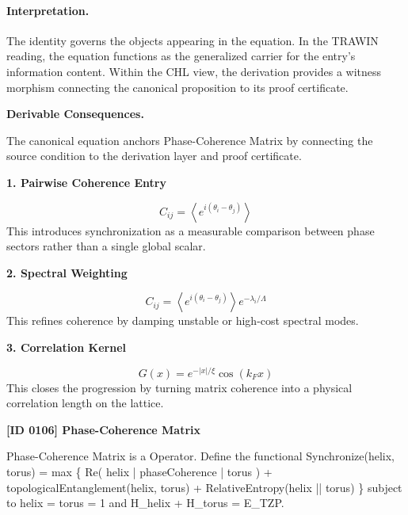 \paragraph{Interpretation.}
The identity governs the objects appearing in the equation. In the TRAWIN reading, the equation functions as the generalized carrier for the entry’s information content. Within the CHL view, the derivation provides a witness morphism connecting the canonical proposition to its proof certificate.

\par\vspace{0.35em}
\noindent\textbf{Derivable Consequences.}\quad
\begingroup
\footnotesize
\raggedright
The canonical equation anchors Phase-Coherence Matrix by connecting the source condition to the derivation layer and proof certificate.
\par\endgroup

\noindent\textbf{1. Pairwise Coherence Entry}\par
\[
C_{ij} = \left\langle e^{i(\theta_i-\theta_j)} \right\rangle
\]
\noindent This introduces synchronization as a measurable comparison between phase sectors rather than a single global scalar.\par
\noindent\textbf{2. Spectral Weighting}\par
\[
C_{ij} = \left\langle e^{i(\theta_i-\theta_j)} \right\rangle e^{-\lambda_i/\Lambda}
\]
\noindent This refines coherence by damping unstable or high-cost spectral modes.\par
\noindent\textbf{3. Correlation Kernel}\par
\[
G(x)= e^{-\lvert x\rvert/\xi}\cos(k_F x)
\]
\noindent This closes the progression by turning matrix coherence into a physical correlation length on the lattice.\par

\clearpage
\noindent\textbf{[ID 0106] Phase-Coherence Matrix}\par
\vspace{0.35em}
\begingroup\small
{}
Phase-Coherence Matrix is a Operator. Define the functional Synchronize(helix, torus) = max \{ Re( helix | phaseCoherence | torus ) + topologicalEntanglement(helix, torus) + RelativeEntropy(helix || torus) \} subject to  helix  =  torus  = 1 and H\_helix + H\_torus = E\_TZP.

